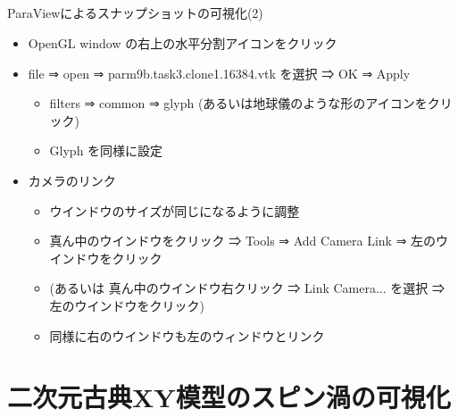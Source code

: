 \subsection*{\redb\whiteb\greenm}
\begin{frame}[t,fragile]{ParaViewによるスナップショットの可視化(2)}
  \begin{itemize}
  \item OpenGL window の右上の水平分割アイコンをクリック
  \item file ⇒ open ⇒ parm9b.task3.clone1.16384.vtk を選択 ⇒ OK ⇒ Apply
    \begin{itemize}
      \item filters ⇒ common ⇒ glyph (あるいは地球儀のような形のアイコンをクリック)
      \item Glyph を同様に設定
    \end{itemize}
  \item カメラのリンク
    \begin{itemize}
    \item ウインドウのサイズが同じになるように調整
    \item 真ん中のウインドウをクリック ⇒ Tools ⇒ Add Camera Link ⇒ 左のウインドウをクリック
    \item (あるいは 真ん中のウインドウ右クリック ⇒ Link Camera... を選択 ⇒ 左のウインドウをクリック)
    \item 同様に右のウインドウも左のウィンドウとリンク
    \end{itemize}
  \end{itemize}
\end{frame}

\section{二次元古典XY模型のスピン渦の可視化}

